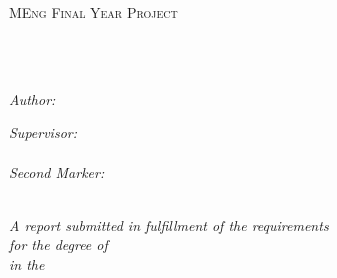 \documentclass[
    11pt,
    oneside, %
    english,
    singlespacing, %
    headsepline, %
]{MastersDoctoralThesis}
\author{Nicolás \textsc{D'Cotta}} %
\theoremstyle{definition}
\begin{document}

    \frontmatter
    \pagestyle{plain}


    \begin{titlepage}
        \begin{center}

            \vspace*{.06\textheight}
            {\scshape\LARGE \univname\par}\vspace{1.5cm}
            \textsc{\Large MEng Final Year Project}\\[0.5cm]

            \HRule \\[0.4cm]
            {\huge \bfseries \ttitle\par}\vspace{0.4cm} %
            \HRule \\[1.5cm]

            \begin{minipage}[t]{0.4\textwidth}
                \begin{flushleft}
                    \large
                    \emph{Author:}\\
                    \href{https://nico.dcotta.eu}{\authorname}
                \end{flushleft}
            \end{minipage}
            \begin{minipage}[t]{0.4\textwidth}
                \begin{flushright}
                    \large
                    \emph{Supervisor:} \\
                    \href{https://www.doc.ic.ac.uk/~wjk/}{\supname} \\[0.4 cm]
                    \emph{Second Marker:} \\
                    \href{https://www.imperial.ac.uk/people/paul.bilokon01}{\markername}
                \end{flushright}
            \end{minipage}\\[3cm]

            \vfill
            \large \textit{A report submitted in fulfillment of the requirements\\ for the degree of \degreename}\\[0.3cm] %
            \textit{in the}\\[0.4 cm]
            \facname \\ \deptname\\[2 cm]


\end{center}
\end{titlepage}
\end{document}
